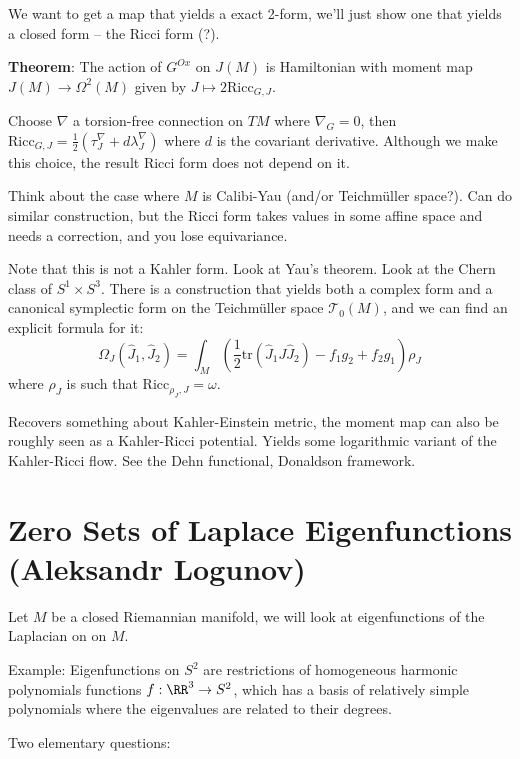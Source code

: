 We want to get a map that yields a exact 2-form, we'll just show one
that yields a closed form -- the Ricci form (?).

\textbf{Theorem}: The action of \(G^{Ox}\) on \(J(M)\) is Hamiltonian
with moment map \(J(M) \to \Omega^2(M)\) given by
\(J \mapsto 2\mathrm{Ricc}_{G, J}\).

Choose \(\nabla\) a torsion-free connection on \(TM\) where
\(\nabla_G = 0\), then
\(\mathrm{Ricc}_{G, J} = \frac 1 2 (\tau^\nabla_J + d\lambda^\nabla_J)\)
where \(d\) is the covariant derivative. Although we make this choice,
the result Ricci form does not depend on it.

Think about the case where \(M\) is Calibi-Yau (and/or Teichmüller
space?). Can do similar construction, but the Ricci form takes values in
some affine space and needs a correction, and you lose equivariance.

Note that this is not a Kahler form. Look at Yau's theorem. Look at the
Chern class of \(S^1\times S^3\). There is a construction that yields
both a complex form and a canonical symplectic form on the Teichmüller
space \(\mathcal T_0(M)\), and we can find an explicit formula for it:
\[
\Omega_J(\hat J_1, \hat J_2) = \int_M \left(\frac 1 2 \mathrm{tr}(\hat J_1 J \hat J_2) - f_1g_2 + f_2g_1 \right)\rho_J
\] where \(\rho_J\) is such that \(\mathrm{Ricc}_{\rho_J, J} = \omega\).

Recovers something about Kahler-Einstein metric, the moment map can also
be roughly seen as a Kahler-Ricci potential. Yields some logarithmic
variant of the Kahler-Ricci flow. See the Dehn functional, Donaldson
framework.

\hypertarget{zero-sets-of-laplace-eigenfunctions-aleksandr-logunov}{%
\section{Zero Sets of Laplace Eigenfunctions (Aleksandr
Logunov)}\label{zero-sets-of-laplace-eigenfunctions-aleksandr-logunov}}

Let \(M\) be a closed Riemannian manifold, we will look at
eigenfunctions of the Laplacian on on \(M\).

Example: Eigenfunctions on \(S^2\) are restrictions of homogeneous
harmonic polynomials functions \(f: \RR^3 \to S^2\), which has a basis
of relatively simple polynomials where the eigenvalues are related to
their degrees.

Two elementary questions:


